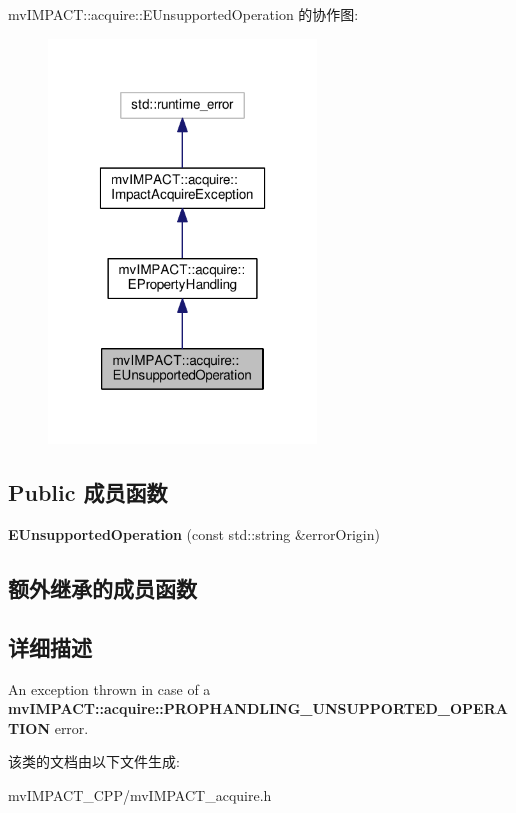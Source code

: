 mv\+I\+M\+P\+A\+C\+T\+:\+:acquire\+:\+:E\+Unsupported\+Operation 的协作图\+:
\nopagebreak
\begin{figure}[H]
\begin{center}
\leavevmode
\includegraphics[width=202pt]{classmv_i_m_p_a_c_t_1_1acquire_1_1_e_unsupported_operation__coll__graph}
\end{center}
\end{figure}
\subsection*{Public 成员函数}
\begin{DoxyCompactItemize}
\item 
\hypertarget{classmv_i_m_p_a_c_t_1_1acquire_1_1_e_unsupported_operation_a44d031db30e8c18e91591660213310bd}{{\bfseries E\+Unsupported\+Operation} (const std\+::string \&error\+Origin)}\label{classmv_i_m_p_a_c_t_1_1acquire_1_1_e_unsupported_operation_a44d031db30e8c18e91591660213310bd}

\end{DoxyCompactItemize}
\subsection*{额外继承的成员函数}


\subsection{详细描述}
An exception thrown in case of a {\bfseries mv\+I\+M\+P\+A\+C\+T\+::acquire\+::\+P\+R\+O\+P\+H\+A\+N\+D\+L\+I\+N\+G\+\_\+\+U\+N\+S\+U\+P\+P\+O\+R\+T\+E\+D\+\_\+\+O\+P\+E\+R\+A\+T\+I\+O\+N} error. 

该类的文档由以下文件生成\+:\begin{DoxyCompactItemize}
\item 
mv\+I\+M\+P\+A\+C\+T\+\_\+\+C\+P\+P/mv\+I\+M\+P\+A\+C\+T\+\_\+acquire.\+h\end{DoxyCompactItemize}
